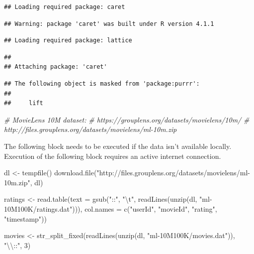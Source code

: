 \documentclass[
]{article}
\newenvironment{Shaded}{}{}
\newcommand{\AttributeTok}[1]{\textcolor[rgb]{0.49,0.56,0.16}{#1}}
\newcommand{\CommentTok}[1]{\textcolor[rgb]{0.38,0.63,0.69}{\textit{#1}}}
\newcommand{\DecValTok}[1]{\textcolor[rgb]{0.25,0.63,0.44}{#1}}
\newcommand{\FunctionTok}[1]{\textcolor[rgb]{0.02,0.16,0.49}{#1}}
\newcommand{\NormalTok}[1]{#1}
\newcommand{\OtherTok}[1]{\textcolor[rgb]{0.00,0.44,0.13}{#1}}
\newcommand{\SpecialCharTok}[1]{\textcolor[rgb]{0.25,0.44,0.63}{#1}}
\newcommand{\StringTok}[1]{\textcolor[rgb]{0.25,0.44,0.63}{#1}}
\begin{document}
\begin{verbatim}
## Loading required package: caret
\end{verbatim}

\begin{verbatim}
## Warning: package 'caret' was built under R version 4.1.1
\end{verbatim}

\begin{verbatim}
## Loading required package: lattice
\end{verbatim}

\begin{verbatim}
## 
## Attaching package: 'caret'
\end{verbatim}

\begin{verbatim}
## The following object is masked from 'package:purrr':
## 
##     lift
\end{verbatim}

\begin{Shaded}
\begin{Highlighting}[]
\CommentTok{\# MovieLens 10M dataset:}
\CommentTok{\# https://grouplens.org/datasets/movielens/10m/}
\CommentTok{\# http://files.grouplens.org/datasets/movielens/ml{-}10m.zip}
\end{Highlighting}
\end{Shaded}

The following block needs to be executed if the data isn't available
locally. Execution of the following block requires an active internet
connection.

\begin{Shaded}
\begin{Highlighting}[]
\NormalTok{dl }\OtherTok{\textless{}{-}} \FunctionTok{tempfile}\NormalTok{()}
\FunctionTok{download.file}\NormalTok{(}\StringTok{"http://files.grouplens.org/datasets/movielens/ml{-}10m.zip"}\NormalTok{, dl)}

\NormalTok{ratings }\OtherTok{\textless{}{-}} \FunctionTok{read.table}\NormalTok{(}\AttributeTok{text =} \FunctionTok{gsub}\NormalTok{(}\StringTok{"::"}\NormalTok{, }\StringTok{"}\SpecialCharTok{\textbackslash{}t}\StringTok{"}\NormalTok{, }\FunctionTok{readLines}\NormalTok{(}\FunctionTok{unzip}\NormalTok{(dl, }\StringTok{"ml{-}10M100K/ratings.dat"}\NormalTok{))),}
                      \AttributeTok{col.names =} \FunctionTok{c}\NormalTok{(}\StringTok{"userId"}\NormalTok{, }\StringTok{"movieId"}\NormalTok{, }\StringTok{"rating"}\NormalTok{, }\StringTok{"timestamp"}\NormalTok{))}


\NormalTok{movies }\OtherTok{\textless{}{-}} \FunctionTok{str\_split\_fixed}\NormalTok{(}\FunctionTok{readLines}\NormalTok{(}\FunctionTok{unzip}\NormalTok{(dl, }\StringTok{"ml{-}10M100K/movies.dat"}\NormalTok{)), }\StringTok{"}\SpecialCharTok{\textbackslash{}\textbackslash{}}\StringTok{::"}\NormalTok{, }\DecValTok{3}\NormalTok{)}
\end{Highlighting}
\end{Shaded}
\end{document}
